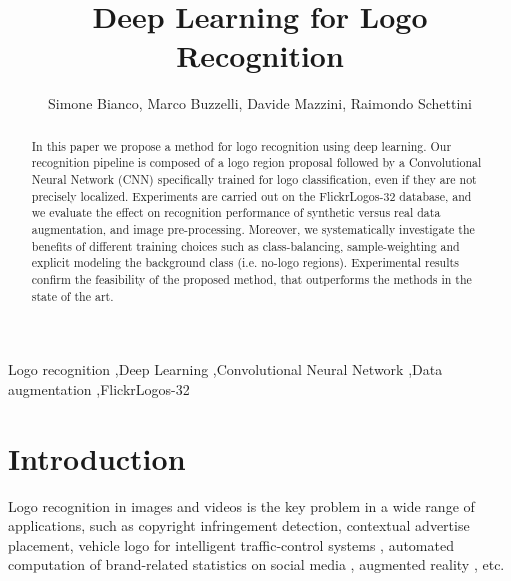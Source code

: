 \documentclass[final,5p,twocolumn]{elsarticle}
\begin{document}
\begin{frontmatter}













\title{Deep Learning for Logo Recognition}
\author{Simone Bianco, Marco Buzzelli, Davide Mazzini, Raimondo Schettini}


\address{DISCo - Universit\`{a} degli Studi di Milano-Bicocca, 20126 Milano, Italy}


\begin{abstract}
In this paper we propose a method for logo recognition using deep learning. Our recognition pipeline is composed of a logo region proposal followed by a Convolutional Neural Network (CNN) specifically trained for logo classification, even if they are not precisely localized. Experiments are carried out on the FlickrLogos-32 database, and we evaluate the effect on recognition performance of synthetic versus real data augmentation, and image pre-processing. Moreover, we systematically investigate the benefits of different training choices such as class-balancing, sample-weighting and explicit modeling the background class (i.e. no-logo regions). Experimental results confirm the feasibility of the proposed method, that outperforms the methods in the state of the art.
\end{abstract}

\begin{keyword}
Logo recognition \sep Deep Learning \sep Convolutional Neural Network  \sep Data augmentation \sep FlickrLogos-32




\end{keyword}

\end{frontmatter}



\section{Introduction}
\label{sec:intro}
Logo recognition in images and videos is the key problem in a wide range of applications, such as copyright infringement detection, contextual advertise placement, vehicle logo for intelligent traffic-control systems  \cite{psyllos2010vehicle}, automated computation of brand-related statistics on social media \cite{gao2014brand}, augmented reality \cite{hagbi2011shape}, etc.
\end{document}
